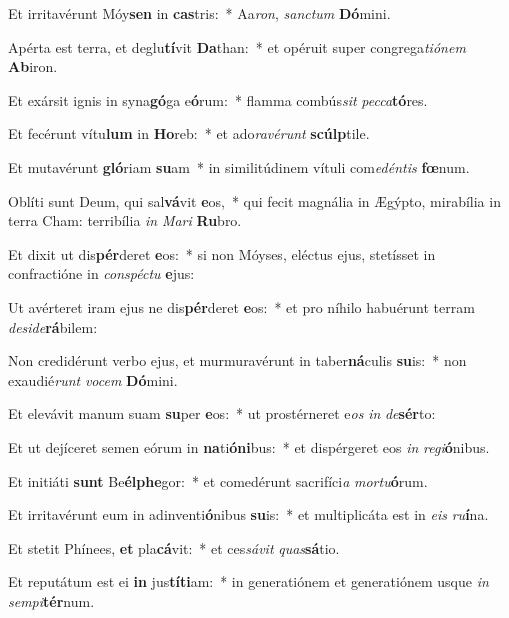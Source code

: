 \item Et irritavérunt Móy\textbf{sen} in \textbf{cas}tris:~* Aa\textit{ron}, \textit{sanc}\textit{tum} \textbf{Dó}mini.
\item Apérta est terra, et deglu\textbf{tí}vit \textbf{Da}than:~* et opéruit super congrega\textit{ti}\textit{ó}\textit{nem} \textbf{Ab}iron.
\item Et exársit ignis in syna\textbf{gó}ga e\textbf{ó}rum:~* flamma combús\textit{sit} \textit{pec}\textit{ca}\textbf{tó}res.
\item Et fecérunt vítu\textbf{lum} in \textbf{Ho}reb:~* et ado\textit{ra}\textit{vé}\textit{runt} \textbf{scúlp}tile.
\item Et mutavérunt \textbf{gló}riam \textbf{su}am~* in similitúdinem vítuli com\textit{e}\textit{dén}\textit{tis} \textbf{fœ}num.
\item Oblíti sunt Deum, qui sal\textbf{vá}vit \textbf{e}os,~* qui fecit magnália in Ægýpto, mirabília in terra Cham: terribília \textit{in} \textit{Ma}\textit{ri} \textbf{Ru}bro.
\item Et dixit ut dis\textbf{pér}deret \textbf{e}os:~* si non Móyses, eléctus ejus, stetísset in confractióne in \textit{con}\textit{spéc}\textit{tu} \textbf{e}jus:
\item Ut avérteret iram ejus ne dis\textbf{pér}deret \textbf{e}os:~* et pro níhilo habuérunt terram \textit{de}\textit{si}\textit{de}\textbf{rá}bilem:
\item Non credidérunt verbo ejus, et murmuravérunt in taber\textbf{ná}culis \textbf{su}is:~* non exaudié\textit{runt} \textit{vo}\textit{cem} \textbf{Dó}mini.
\item Et elevávit manum suam \textbf{su}per \textbf{e}os:~* ut prostérneret e\textit{os} \textit{in} \textit{de}\textbf{sér}to:
\item Et ut dejíceret semen eórum in \textbf{na}ti\textbf{ó}\textbf{ni}bus:~* et dispérgeret eos \textit{in} \textit{re}\textit{gi}\textbf{ó}nibus.
\item Et initiáti \textbf{sunt} Be\textbf{él}\textbf{phe}gor:~* et comedérunt sacrifíci\textit{a} \textit{mor}\textit{tu}\textbf{ó}rum.
\item Et irritavérunt eum in adinventi\textbf{ó}nibus \textbf{su}is:~* et multiplicáta est in \textit{e}\textit{is} \textit{ru}\textbf{í}na.
\item Et stetit Phínees, \textbf{et} pla\textbf{cá}vit:~* et ces\textit{sá}\textit{vit} \textit{quas}\textbf{sá}tio.
\item Et reputátum est ei \textbf{in} jus\textbf{tí}\textbf{ti}am:~* in generatiónem et generatiónem usque \textit{in} \textit{sem}\textit{pi}\textbf{tér}num.
